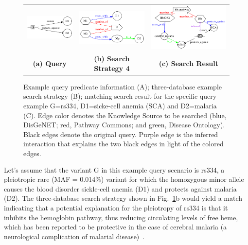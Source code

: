 \documentclass[11pt,notitlepage]{article}
\begin{document}
\begin{figure}[h!]
  \begin{tabular}{ccc}
  \includegraphics[width=1.4in]{baseproblem.png} &    
  \includegraphics[width=2in]{net4.png} &
  \includegraphics[width=2.5in]{net5.png} \\
                  {\bf (a) Query} & {\bf (b) Search Strategy 4} & {\bf (c) Search Result}
  \end{tabular}
  \caption{Example query predicate information (A); three-database example
    search strategy (B); matching search result for the specific query example
    G=rs334, D1=sicke-cell anemia (SCA) and D2=malaria (C). Edge color denotes
    the Knowledge Source to be searched (blue, DisGeNET; red, Pathway Commons;
    and green, Disease Ontology). Black edges denote the original query. Purple
    edge is the inferred interaction that explains the two black edges in light
    of the colored edges.}
  \label{fig:threedb}
\end{figure}
Let's assume that the variant G in this example query scenario is rs334, a
pleiotropic rare (MAF = 0.014\%) variant for which the homozygous minor allele
causes the blood disorder sickle-cell anemia (D1) and protects against malaria
(D2). The three-database search strategy shown in Fig.~\ref{fig:threedb}b would
yield a match indicating that a potential explanation for the pleiotropy of
rs334 is that it inhibits the hemoglobin pathway, thus reducing circulating
levels of free heme, which has been reported to be protective in the case of
cerebral malaria (a neurological complication of malarial
disease)~\cite{Ferreira:2011ff}.
\end{document}
